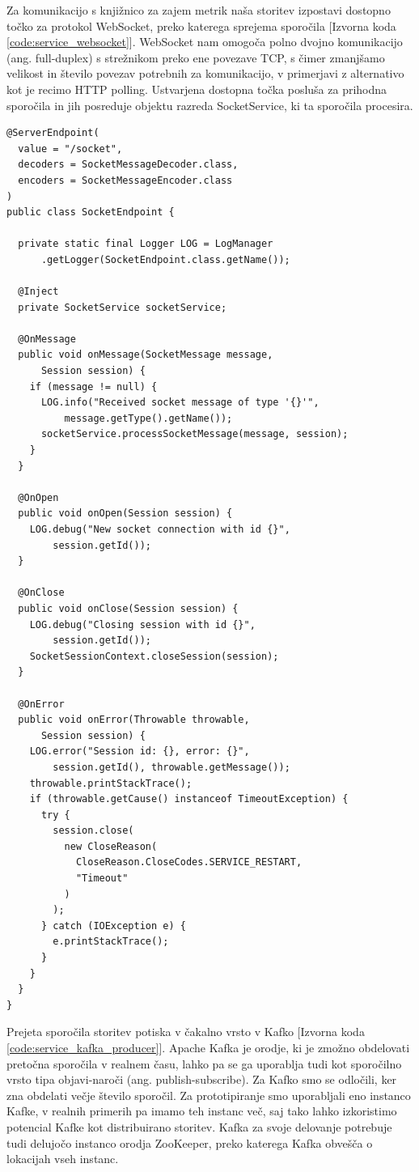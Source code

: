 \documentclass[a4paper, 12pt]{book}
\begin{document}
Za komunikacijo s knjižnico za zajem metrik naša storitev izpostavi dostopno točko za protokol WebSocket, preko katerega sprejema sporočila [Izvorna koda \ref{code:service_websocket}]. WebSocket nam omogoča polno dvojno komunikacijo (ang. full-duplex) s strežnikom preko ene povezave TCP, s čimer zmanjšamo velikost in število povezav potrebnih za komunikacijo, v primerjavi z alternativo kot je recimo HTTP polling. Ustvarjena dostopna točka posluša za prihodna sporočila in jih posreduje objektu razreda SocketService, ki ta sporočila procesira.

\begin{lstlisting}[label=code:service_websocket, caption=WebSocket dostopna točka]
@ServerEndpoint(
  value = "/socket",
  decoders = SocketMessageDecoder.class,
  encoders = SocketMessageEncoder.class
)
public class SocketEndpoint {

  private static final Logger LOG = LogManager
      .getLogger(SocketEndpoint.class.getName());

  @Inject
  private SocketService socketService;

  @OnMessage
  public void onMessage(SocketMessage message,
      Session session) {
    if (message != null) {
      LOG.info("Received socket message of type '{}'",
          message.getType().getName());
      socketService.processSocketMessage(message, session);
    }
  }

  @OnOpen
  public void onOpen(Session session) {
    LOG.debug("New socket connection with id {}",
        session.getId());
  }

  @OnClose
  public void onClose(Session session) {
    LOG.debug("Closing session with id {}",
        session.getId());
    SocketSessionContext.closeSession(session);
  }

  @OnError
  public void onError(Throwable throwable,
      Session session) {
    LOG.error("Session id: {}, error: {}",
        session.getId(), throwable.getMessage());
    throwable.printStackTrace();
    if (throwable.getCause() instanceof TimeoutException) {
      try {
        session.close(
          new CloseReason(
            CloseReason.CloseCodes.SERVICE_RESTART,
            "Timeout"
          )
        );
      } catch (IOException e) {
        e.printStackTrace();
      }
    }
  }
}
\end{lstlisting} 

Prejeta sporočila storitev potiska v čakalno vrsto v Kafko [Izvorna koda \ref{code:service_kafka_producer}]. Apache Kafka je orodje, ki je zmožno obdelovati pretočna sporočila v realnem času, lahko pa se ga uporablja tudi kot sporočilno vrsto tipa objavi-naroči (ang. publish-subscribe). Za Kafko smo se odločili, ker zna obdelati večje število sporočil. Za prototipiranje smo uporabljali eno instanco Kafke, v realnih primerih pa imamo teh instanc več, saj tako lahko izkoristimo potencial Kafke kot distribuirano storitev. Kafka za svoje delovanje potrebuje tudi delujočo instanco orodja ZooKeeper, preko katerega Kafka obvešča o lokacijah vseh instanc.
\end{document}
